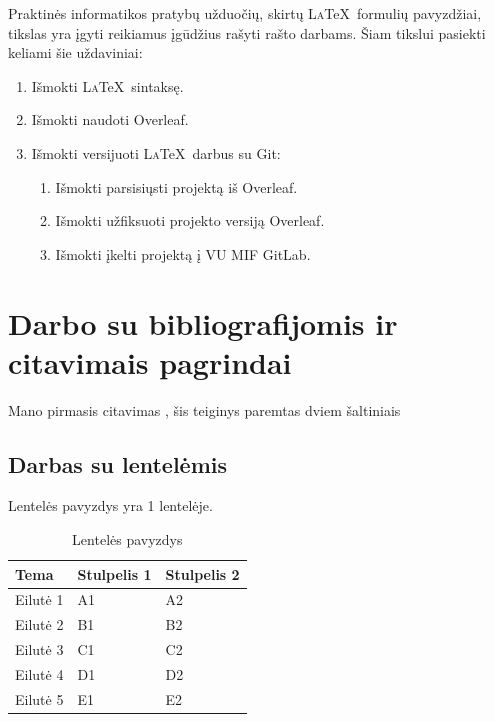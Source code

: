 \documentclass[]{VUMIFTemplateClass}
\begin{document}
Praktinės informatikos pratybų užduočių, skirtų L\textsc{a}\TeX\ formulių pavyzdžiai, tikslas yra įgyti reikiamus įgūdžius rašyti rašto darbams. Šiam tikslui pasiekti keliami šie uždaviniai:
\begin{enumerate}
    \item Išmokti L\textsc{a}\TeX\ sintaksę.
    \item Išmokti naudoti Overleaf.
    \item Išmokti versijuoti L\textsc{a}\TeX\ darbus su Git:
    \begin{enumerate}
        \item Išmokti parsisiųsti projektą iš Overleaf.
        \item Išmokti užfiksuoti projekto versiją Overleaf.
        \item Išmokti įkelti projektą į VU MIF GitLab.
    \end{enumerate}
\end{enumerate}


\section{Darbo su bibliografijomis ir citavimais pagrindai}

Mano pirmasis citavimas \cite{straipsnisZurnale},  šis teiginys paremtas dviem šaltiniais \cite{konferencijosStraipsnis, straipsnisZurnale}


\subsection{Darbas su lentelėmis}

Lentelės pavyzdys yra 1 lentelėje.

\begin{table}[h!]
\centering
\caption{Lentelės pavyzdys}
\begin{tabular}{|l|l|l|}
\hline
\textbf{Tema} & \textbf{Stulpelis 1} & \textbf{Stulpelis 2} \\ \hline
Eilutė 1      & A1                   & A2                   \\ \hline
Eilutė 2      & B1                   & B2                   \\ \hline
Eilutė 3      & C1                   & C2                   \\ \hline
Eilutė 4      & D1                   & D2                   \\ \hline
Eilutė 5      & E1                   & E2                   \\ \hline
\end{tabular}
\end{table}
\end{document}
